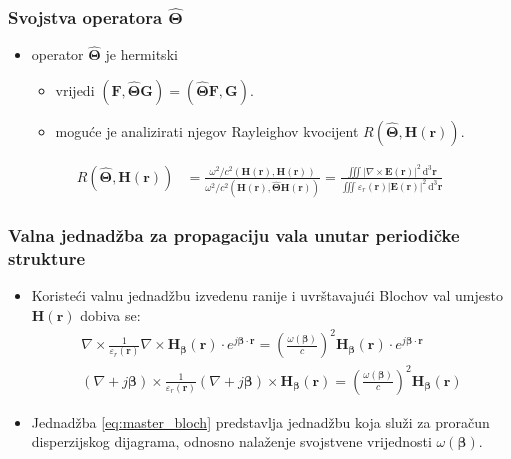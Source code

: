 \documentclass{beamer}
\begin{document}
\begin{frame}
	\frametitle{Svojstva operatora $\hat{\bm{\Theta}}$}
	\begin{itemize}
		\item operator $\hat{\bm{\Theta}}$ je hermitski
		\begin{itemize}
			\item vrijedi ${\left(\mathbf{F}, \hat{\bm{\Theta}}\mathbf{G}\right)
	=\left(\hat{\bm{\Theta}} \mathbf{F}, \mathbf{G}\right)}$.
			\item moguće je analizirati njegov Rayleighov kvocijent
				$R \left(\hat{\bm{\Theta}}, \mathbf{H}(\mathbf{r}) \right)$.
		\end{itemize}
	\end{itemize}
	\begin{align}
		R \left( \hat{\bm{\Theta}}, \mathbf{H}(\mathbf{r}) \right)
		&= \frac{
			\omega^2/c^2
			\left(
			\mathbf{H}(\mathbf{r}), \mathbf{H}(\mathbf{r})
			\right)
		}
		{
			\omega^2/c^2
			\left(
			\mathbf{H}(\mathbf{r}), \hat{\bm{\Theta}}\mathbf{H}(\mathbf{r})
			\right)
		}
		= \frac{
			\iiint |\nabla \times \mathbf{E}(\mathbf{r})|^2
			\, \mathrm{d}^3\mathbf{r}}
		{\iiint \varepsilon_r(\mathbf{r}) | \mathbf{E}( \mathbf{r} ) |^2
		\, \mathrm{d}^3\mathbf{r}} \label{eq:rayleighE}
	\end{align}
\end{frame}

\begin{frame}
	\frametitle{Valna jednadžba za propagaciju vala unutar periodičke strukture}
	\begin{itemize}
		\item Koristeći valnu jednadžbu izvedenu ranije i uvrštavajući Blochov
            val umjesto $\mathbf{H}(\mathbf{r})$ dobiva se:
		\begin{align} \label{eq:master_bloch}
			\nabla \times
			\frac{1}{\varepsilon_r(\mathbf{r})} \nabla \times
			\mathbf{H}_{\bm{\beta}}(\mathbf{r}) \cdot
			e^{j {\bm{\beta}} \cdot \mathbf{r}}
			= \left(
                \frac{\omega({\bm{\beta}})}{c}
			\right)^2
			\mathbf{H}_{\bm{\beta}}(\mathbf{r}) \cdot
				e^{j {\bm{\beta}} \cdot \mathbf{r}}	\nonumber \\
			(\nabla + j{\bm{\beta}}) \times
			\frac{1}{\varepsilon_r(\mathbf{r})}
			(\nabla + j{\bm{\beta}}) \times
			\mathbf{H}_{\bm{\beta}}(\mathbf{r})
			= \left(
			\frac{\omega ({\bm{\beta}})}{c}
			\right)^2
			\mathbf{H}_{\bm{\beta}}(\mathbf{r})
		\end{align}

		\item Jednadžba \ref{eq:master_bloch} predstavlja jednadžbu koja služi za
			proračun disperzijskog dijagrama, odnosno nalaženje svojstvene
			vrijednosti ${\omega ({\bm{\beta}})}$.
	\end{itemize}
\end{frame}
\end{document}
